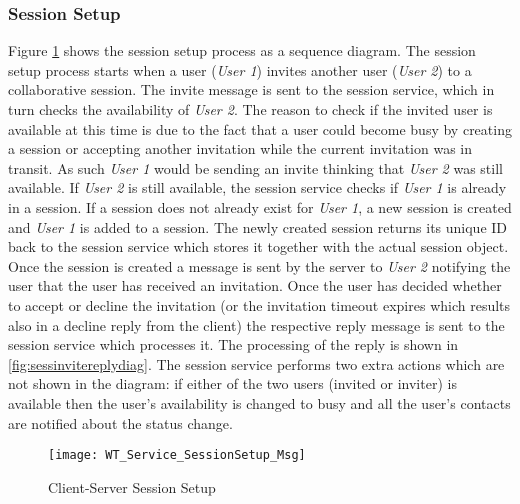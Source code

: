 \subsubsection*{Session Setup}

Figure \ref{fig:sesssetupseqdiag} shows the session setup process as a sequence diagram. The session setup process starts when a user (\textit{User 1}) invites another user (\textit{User 2}) to a collaborative session. The invite message is sent to the session service, which in turn checks the availability of \textit{User 2}. The reason to check if the invited user is available at this time is due to the fact that a user could become busy by creating a session or accepting another invitation while the current invitation was in transit. As such \textit{User 1} would be sending an invite thinking that \textit{User 2} was still available. If \textit{User 2} is still available, the session service checks if \textit{User 1} is already in a session. If a session does not already exist for \textit{User 1}, a new session is created and \textit{User 1} is added to a session. The newly created session returns its unique ID back to the session service which stores it together with the actual session object. Once the session is created a message is sent by the server to \textit{User 2} notifying the user that the user has received an invitation. Once the user has decided whether to accept or decline the invitation (or the invitation timeout expires which results also in a decline reply from the client) the respective reply message is sent to the session service which processes it. The processing of the reply is shown in \ref{fig:sessinvitereplydiag}. The session service performs two extra actions which are not shown in the diagram: if either of the two users (invited or inviter) is available then the user's availability is changed to busy and all the user's contacts are notified about the status change.

\begin{figure}
	\centering
	\texttt{[image: WT\_Service\_SessionSetup\_Msg]}
	\caption{Client-Server Session Setup}
	\label{fig:sesssetupseqdiag}
\end{figure}

